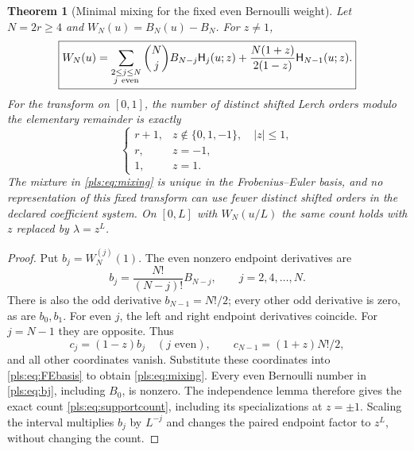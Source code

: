 \documentclass[11pt,letterpaper]{article}
\numberwithin{equation}{section}
\newtheorem{theorem}{Theorem}[section]
\theoremstyle{definition}
\theoremstyle{remark}\newtheorem{remark}[theorem]{Remark}
\newcommand{\HFE}{\mathsf H}
\begin{document}
\begin{theorem}[Minimal mixing for the fixed even Bernoulli weight]
\label{pls:thm:mixing}
Let $N=2r\ge4$ and $W_N(u)=B_N(u)-B_N$. For $z\ne1$,
\begin{equation}\label{pls:eq:mixing}
 \boxed{\displaystyle
 W_N(u)=\sum_{\substack{2\le j\le N\\j\ {\rm even}}}
       \binom Nj B_{N-j}\HFE_j(u;z)
   +\frac{N(1+z)}{2(1-z)}\HFE_{N-1}(u;z).}
\end{equation}
For the transform on $[0,1]$, the number of distinct shifted Lerch
orders modulo the elementary remainder is exactly
\begin{equation}\label{pls:eq:supportcount}
 \begin{cases}
 r+1,& z\notin\{0,1,-1\},\quad |z|\le1,\\
 r,& z=-1,\\
 1,& z=1.
 \end{cases}
\end{equation}
The mixture in \eqref{pls:eq:mixing} is unique in the
Frobenius--Euler basis, and no representation of this fixed transform
can use fewer distinct shifted orders in the declared coefficient
system. On $[0,L]$ with $W_N(u/L)$ the same count holds with $z$
replaced by $\lambda=z^L$.
\end{theorem}
\begin{proof}
Put $b_j=W_N^{(j)}(1)$. The even nonzero endpoint derivatives are
\begin{equation}\label{pls:eq:bj}
 b_j=\frac{N!}{(N-j)!}B_{N-j},\qquad j=2,4,\ldots,N.
\end{equation}
There is also the odd derivative $b_{N-1}=N!/2$; every other odd
derivative is zero, as are $b_0,b_1$.
For even $j$, the left and right endpoint derivatives coincide.
For $j=N-1$ they are opposite. Thus
\begin{equation}\label{pls:eq:mixc}
 c_j=(1-z)b_j\quad(j\text{ even}),\qquad
 c_{N-1}=(1+z)N!/2,
\end{equation}
and all other coordinates vanish. Substitute these coordinates into
\eqref{pls:eq:FEbasis} to obtain \eqref{pls:eq:mixing}.
Every even Bernoulli number in \eqref{pls:eq:bj}, including $B_0$,
is nonzero. The independence lemma therefore gives the exact count
\eqref{pls:eq:supportcount}, including its specializations at $z=\pm1$.
Scaling the interval multiplies $b_j$ by $L^{-j}$ and changes the
paired endpoint factor to $z^L$, without changing the count.
\end{proof}
\end{document}
